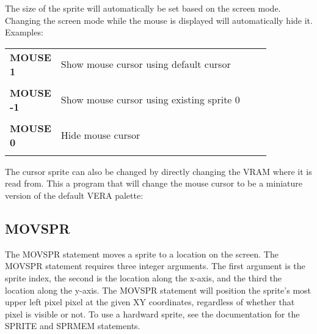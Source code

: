 The size of the sprite will automatically be set based on the screen mode.
Changing the screen mode while the mouse is displayed will automatically hide
it.\\

Examples:\\

\begin{tabular}{l p{0.85\linewidth}}

	{\ttfamily\bfseries MOUSE 1} & Show mouse cursor using default cursor\\\\

	{\ttfamily\bfseries MOUSE -1} & Show mouse cursor using existing sprite 0 \\\\

	{\ttfamily\bfseries MOUSE 0} & Hide mouse cursor\\\\

\end{tabular}

\vspace{16pt}

The cursor sprite can also be changed by directly changing the VRAM where it is
read from.  This a program that will change the mouse cursor to be a miniature
version of the default VERA palette:\\


\subsection{MOVSPR}

The {\ttfamily MOVSPR} statement moves a sprite to a location on the screen.
The {\ttfamily MOVSPR} statement requires three integer arguments.  The first
argument is the sprite index, the second is the location along the x-axis, and
the third the location along the y-axis.  The {\ttfamily MOVSPR} statement will
position the sprite's most upper left pixel pixel at the given XY coordinates,
regardless of whether that pixel is visible or not.  To use a hardward sprite,
see the documentation for the {\ttfamily SPRITE} and {\ttfamily SPRMEM}
statements.\\

